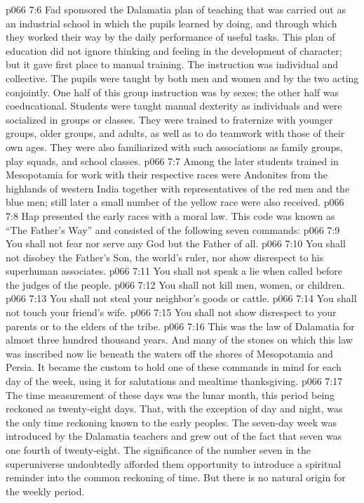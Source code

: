 \pc \vs p066 7:6 Fad sponsored the Dalamatia plan of teaching that was carried out as an industrial school in which the pupils learned by doing, and through which they worked their way by the daily performance of useful tasks. This plan of education did not ignore thinking and feeling in the development of character; but it gave first place to manual training. The instruction was individual and collective. The pupils were taught by both men and women and by the two acting conjointly. One half of this group instruction was by sexes; the other half was coeducational. Students were taught manual dexterity as individuals and were socialized in groups or classes. They were trained to fraternize with younger groups, older groups, and adults, as well as to do teamwork with those of their own ages. They were also familiarized with such associations as family groups, play squads, and school classes.
\vs p066 7:7 Among the later students trained in Mesopotamia for work with their respective races were Andonites from the highlands of western India together with representatives of the red men and the blue men; still later a small number of the yellow race were also received.
\pc \vs p066 7:8 Hap presented the early races with a moral law. This code was known as “The Father’s Way” and consisted of the following seven commands:
\pc \vs p066 7:9 \bibnobreakspace You shall not fear nor serve any God but the Father of all.
\vs p066 7:10 \bibnobreakspace You shall not disobey the Father’s Son, the world’s ruler, nor show disrespect to his superhuman associates.
\vs p066 7:11 \bibnobreakspace You shall not speak a lie when called before the judges of the people.
\vs p066 7:12 \bibnobreakspace You shall not kill men, women, or children.
\vs p066 7:13 \bibnobreakspace You shall not steal your neighbor’s goods or cattle.
\vs p066 7:14 \bibnobreakspace You shall not touch your friend’s wife.
\vs p066 7:15 \bibnobreakspace You shall not show disrespect to your parents or to the elders of the tribe.
\pc \vs p066 7:16 This was the law of Dalamatia for almost three hundred thousand years. And many of the stones on which this law was inscribed now lie beneath the waters off the shores of Mesopotamia and Persia. It became the custom to hold one of these commands in mind for each day of the week, using it for salutations and mealtime thanksgiving.
\pc \vs p066 7:17 The time measurement of these days was the lunar month, this period being reckoned as twenty\hyp{}eight days. That, with the exception of day and night, was the only time reckoning known to the early peoples. The seven\hyp{}day week was introduced by the Dalamatia teachers and grew out of the fact that seven was one fourth of twenty\hyp{}eight. The significance of the number seven in the superuniverse undoubtedly afforded them opportunity to introduce a spiritual reminder into the common reckoning of time. But there is no natural origin for the weekly period.
